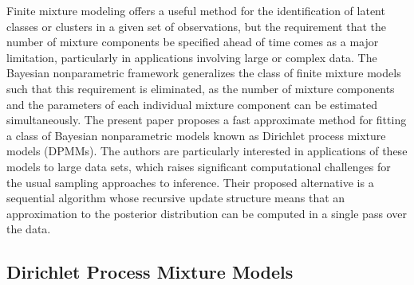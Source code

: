 \documentclass{uwstat572}
\begin{document}
Finite mixture modeling offers a useful method for the identification of latent classes or clusters in a given set of observations, but the requirement that the number of mixture components be specified ahead of time comes as a major limitation, particularly in applications involving large or complex data. The Bayesian nonparametric framework generalizes the class of finite mixture models such that this requirement is eliminated, as the number of mixture components and the parameters of each individual mixture component can be estimated simultaneously. The present paper \citep{zhang} proposes a fast approximate method for fitting a class of Bayesian nonparametric models known as Dirichlet process mixture models (DPMMs). The authors are particularly interested in applications of these models to large data sets, which raises significant computational challenges for the usual sampling approaches to inference. Their proposed alternative is a sequential algorithm whose recursive update structure means that an approximation to the posterior distribution can be computed in a single pass over the data.


\subsection{Dirichlet Process Mixture Models}
\end{document}
